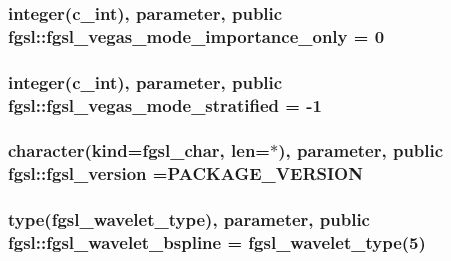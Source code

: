 \hypertarget{classfgsl_a8b3b603c4ff1fa9726169eaeb1617cf4}{
\subsubsection[{fgsl\-\_\-vegas\-\_\-mode\-\_\-importance\-\_\-only}]{\setlength{\rightskip}{0pt plus 5cm}integer(c\-\_\-int), parameter, public fgsl\-::fgsl\-\_\-vegas\-\_\-mode\-\_\-importance\-\_\-only = 0}}\label{classfgsl_a8b3b603c4ff1fa9726169eaeb1617cf4}
\hypertarget{classfgsl_a03809231ad730f80ecda79c11940298e}{
\subsubsection[{fgsl\-\_\-vegas\-\_\-mode\-\_\-stratified}]{\setlength{\rightskip}{0pt plus 5cm}integer(c\-\_\-int), parameter, public fgsl\-::fgsl\-\_\-vegas\-\_\-mode\-\_\-stratified = -\/1}}\label{classfgsl_a03809231ad730f80ecda79c11940298e}
\hypertarget{classfgsl_a3443bae7bac02745f1562e6c2f891656}{
\subsubsection[{fgsl\-\_\-version}]{\setlength{\rightskip}{0pt plus 5cm}character(kind={\bf fgsl\-\_\-char}, len=$\ast$), parameter, public fgsl\-::fgsl\-\_\-version =P\-A\-C\-K\-A\-G\-E\-\_\-\-V\-E\-R\-S\-I\-O\-N}}\label{classfgsl_a3443bae7bac02745f1562e6c2f891656}
\hypertarget{classfgsl_a6fb8d8501c5f52d65dd32be21f7a8431}{
\subsubsection[{fgsl\-\_\-wavelet\-\_\-bspline}]{\setlength{\rightskip}{0pt plus 5cm}type({\bf fgsl\-\_\-wavelet\-\_\-type}), parameter, public fgsl\-::fgsl\-\_\-wavelet\-\_\-bspline = {\bf fgsl\-\_\-wavelet\-\_\-type}(5)}}\label{classfgsl_a6fb8d8501c5f52d65dd32be21f7a8431}
